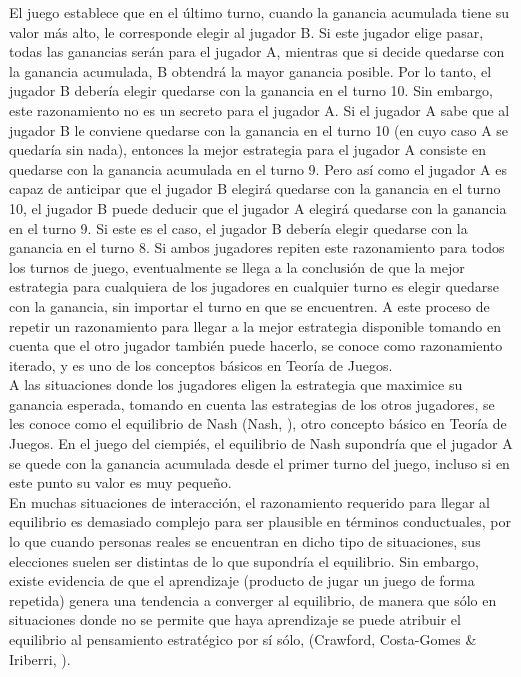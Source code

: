 El juego establece que en el último turno, cuando la ganancia acumulada tiene su valor más alto, le corresponde elegir al jugador B. Si este jugador elige pasar, todas las ganancias serán para el jugador A, mientras que si decide quedarse con la ganancia acumulada, B obtendrá la mayor ganancia posible. Por lo tanto, el jugador B debería elegir quedarse con la ganancia en el turno 10. Sin embargo, este razonamiento no es un secreto para el jugador A. Si el jugador A sabe que al jugador B le conviene quedarse con la ganancia en el turno 10 (en cuyo caso A se quedaría sin nada), entonces la mejor estrategia para el jugador A consiste en quedarse con la ganancia acumulada en el turno 9. Pero así como el jugador A es capaz de anticipar que el jugador B elegirá quedarse con la ganancia en el turno 10, el jugador B puede deducir que el jugador A elegirá quedarse con la ganancia en el turno 9. Si este es el caso, el jugador B debería elegir quedarse con la ganancia en el turno 8. Si ambos jugadores repiten este razonamiento para todos los turnos de juego, eventualmente se llega a la conclusión de que la mejor estrategia para cualquiera de los jugadores en cualquier turno es elegir quedarse con la ganancia, sin importar el turno en que se encuentren. A este proceso de repetir un razonamiento para llegar a la mejor estrategia disponible tomando en cuenta que el otro jugador también puede hacerlo, se conoce como razonamiento iterado, y es uno de los conceptos básicos en Teoría de Juegos.\\

A las situaciones donde los jugadores eligen la estrategia que maximice su ganancia esperada, tomando en cuenta las estrategias de los otros jugadores, se les conoce como el equilibrio de Nash (Nash, \citeyear{Nash}), otro concepto básico en Teoría de Juegos. En el juego del ciempiés, el equilibrio de Nash supondría que el jugador A se quede con la ganancia acumulada desde el primer turno del juego, incluso si en este punto su valor es muy pequeño.\\

En muchas situaciones de interacción, el razonamiento requerido para llegar al equilibrio es demasiado complejo para ser plausible en términos conductuales, por lo que cuando personas reales se encuentran en dicho tipo de situaciones, sus elecciones suelen ser distintas de lo que supondría el equilibrio. Sin embargo, existe evidencia de que el aprendizaje (producto de jugar un juego de forma repetida) genera una tendencia a converger al equilibrio, de manera que sólo en situaciones donde no se permite que haya aprendizaje se puede atribuir el equilibrio al pensamiento estratégico por sí sólo, (Crawford, Costa-Gomes & Iriberri, \citeyear{Crawford}).\\

